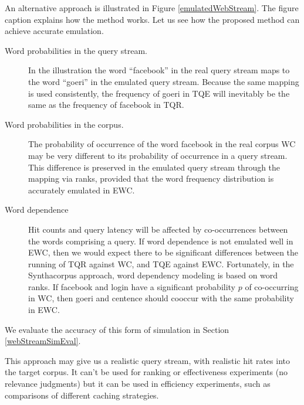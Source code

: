 \documentclass[11pt]{report}
\begin{document}
An alternative approach is illustrated in Figure
\ref{emulatedWebStream}. The figure caption explains how the method
works.  Let us see how the proposed method can achieve accurate
emulation.

\begin{description}
\item[Word probabilities in the query stream.] In the illustration
the word ``facebook'' in the real query
stream maps to the word ``goeri'' in the emulated query stream.  Because the
same mapping is used consistently, the frequency of goeri in TQE will
inevitably be the same as the frequency of facebook in TQR.
\item[Word probabilities in the corpus.] The probability of
  occurrence of the word facebook in the real corpus WC may be very
  different to its probability of occurrence in a query stream.  This
  difference is preserved in the emulated query stream through the mapping
  via ranks, provided that the word frequency distribution is
  accurately emulated in EWC.
  \item[Word dependence] Hit counts and query latency will be affected
    by co-occurrences between the words comprising a query.  If word
    dependence is not emulated well in EWC, then we would expect there
    to be significant differences between the running of TQR against
    WC, and TQE against EWC.  Fortunately, in the Synthacorpus approach, word
    dependency modeling is based on word ranks. If facebook and login
    have a significant probability $p$ of co-occurring in WC, then
    goeri and centence should cooccur with the same probability in
    EWC.
\end{description}



We evaluate the accuracy of this form of simulation in Section \ref{webStreamSimEval}.

This approach may give us a realistic query stream, with realistic hit rates into the
target corpus.  It can't be used for ranking or effectiveness
experiments (no relevance judgments) but it can be used in efficiency
experiments, such as comparisons of different caching strategies.
\end{document}
